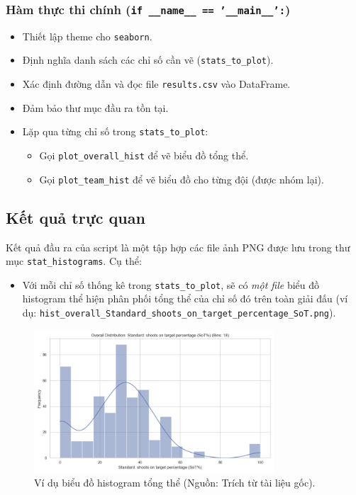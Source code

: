 \documentclass[12pt, a4paper]{report}
\begin{document}
\subsubsection*{Hàm thực thi chính (\texttt{if \_\_name\_\_ == '\_\_main\_\_':})}
\begin{itemize}
    \item Thiết lập theme cho \texttt{seaborn}.
    \item Định nghĩa danh sách các chỉ số cần vẽ (\texttt{stats\_to\_plot}).
    \item Xác định đường dẫn và đọc file \texttt{results.csv} vào DataFrame.
    \item Đảm bảo thư mục đầu ra tồn tại.
    \item Lặp qua từng chỉ số trong \texttt{stats\_to\_plot}:
    \begin{itemize}
        \item Gọi \texttt{plot\_overall\_hist} để vẽ biểu đồ tổng thể.
        \item Gọi \texttt{plot\_team\_hist} để vẽ biểu đồ cho từng đội (được nhóm lại).
    \end{itemize}
\end{itemize}

\subsection{Kết quả trực quan}
Kết quả đầu ra của script là một tập hợp các file ảnh PNG được lưu trong thư mục \texttt{stat\_histograms}.
Cụ thể:
\begin{itemize}
    \item Với mỗi chỉ số thống kê trong \texttt{stats\_to\_plot}, sẽ có \textit{một file} biểu đồ histogram thể hiện phân phối tổng thể của chỉ số đó trên toàn giải đấu \sloppypar
    (ví dụ: \texttt{hist\_overall\_Standard\_shoots\_on\_target\_percentage\_SoT.png}).
\end{itemize}

\begin{figure}[H]
    \centering
    \includegraphics[width=0.8\textwidth]{overall.png}
    \caption{Ví dụ biểu đồ histogram tổng thể (Nguồn: Trích từ tài liệu gốc).}
    \label{fig:hist_overall_sot}
\end{figure}
\end{document}
